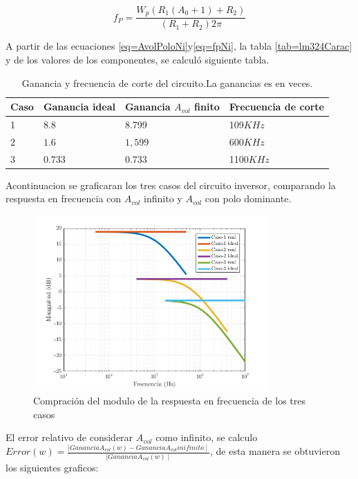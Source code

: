 \documentclass[../../main.tex]{subfiles}
\begin{document}
\begin{equation}
f_{P}=\frac{W_{p}(R_{1}(A_{0}+1)+R_{2})}{(R_{1}+R_{2})2 \pi } \label{eq=fpNi}
\end{equation}

A partir de las ecuaciones \ref{eq=AvolPoloNi}y\ref{eq=fpNi}, la tabla \ref{tab=lm324Carac} y de los valores de los componentes, se calculó siguiente tabla.

\begin{table}[h]
\begin{center}
\begin{tabular}{|l|l|l|l|}
\hline
Caso &Ganancia ideal & Ganancia $A_{vol}$ finito & Frecuencia de corte\\
\hline \hline
1 & $8.8$ & 8.799 & 109$KHz$ \\ \hline
2 & $1.6$ &  $1,599 $ &  600$KHz$  \\ \hline
3 & $0.733$ &0.733 &1100$KHz$\\ \hline
\end{tabular}
\caption{Ganancia y frecuencia de corte del circuito.La ganancias es en veces.} 
\label{tab=gananciayFrecCorteNi}
\end{center}
\end{table}
Acontinuacion se graficaran los tres casos del circuito inversor, comparando la respuesta en frecuencia con  $A_{vol}$ infinito y $A_{vol}$ con polo dominante.

\begin{figure}[H]
\centering
\includegraphics[width=0.8\textwidth]{real_ideal_mag_n}
\caption{Compración del modulo de la respuesta en frecuencia de los tres casos}
\end{figure}

El error relativo de considerar $A_{vol}$  como infinito, se calculo $ Error(w) = \frac {\mid Ganancia A_{vol}(w) -Ganancia A_{vol} inifinito \mid} {\mid Ganancia A_{vol} (w) \mid }$, de esta manera se obtuvieron los siguientes graficos:
\end{document}

